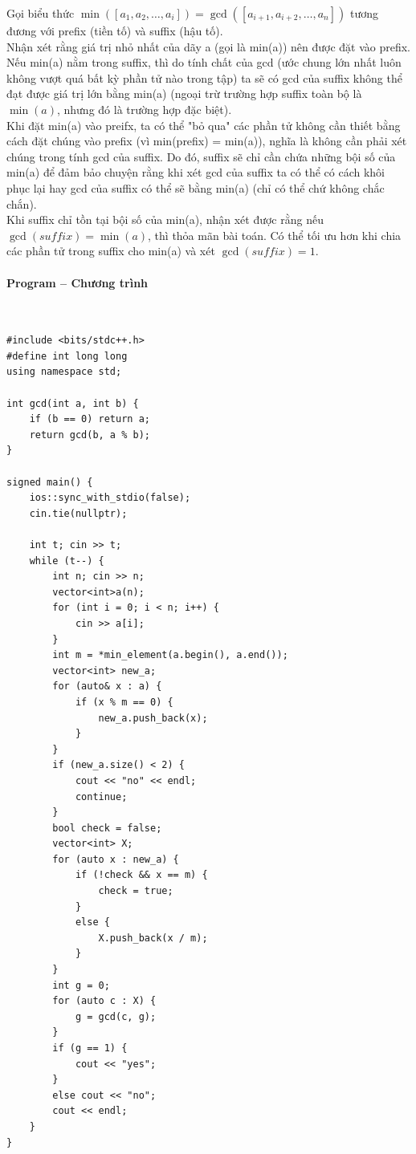 \documentclass{article}
\begin{document}
Gọi biểu thức $\min([a_1, a_2, \ldots, a_i]) = \gcd([a_{i+1}, a_{i+2}, \ldots, a_n])$ tương đương với prefix (tiền tố) và suffix (hậu tố).\\

Nhận xét rằng giá trị nhỏ nhất của dãy a (gọi là min(a)) nên được đặt vào prefix. Nếu min(a) nằm trong suffix, thì do tính chất của gcd (ước chung lớn nhất luôn không vượt quá bất kỳ phần tử nào trong tập) ta sẽ có gcd của suffix không thể đạt được giá trị lớn bằng min(a) (ngoại trừ trường hợp suffix toàn bộ là $\min(a)$, nhưng đó là trường hợp đặc biệt).\\

Khi đặt min(a) vào preifx, ta có thể "bỏ qua" các phần tử không cần thiết bằng cách đặt chúng vào prefix (vì min(prefix) = min(a)), nghĩa là không cần phải xét chúng trong tính gcd của suffix. Do đó, suffix sẽ chỉ cần chứa những bội số của min(a) để đảm bảo chuyện rằng khi xét gcd của suffix ta có thể có cách khôi phục lại hay gcd của suffix có thể sẽ bằng min(a) (chỉ có thể chứ không chắc chắn).\\

Khi suffix chỉ tồn tại bội số của min(a), nhận xét được rằng nếu $\gcd(suffix) = \min(a)$, thì thỏa mãn bài toán. Có thể tối ưu hơn khi chia các phần tử trong suffix cho min(a) và xét $\gcd(suffix) = 1$.

\paragraph{Program -- Chương trình} \mbox{} \\

\begin{lstlisting}
#include <bits/stdc++.h>
#define int long long
using namespace std;

int gcd(int a, int b) {
	if (b == 0) return a;
	return gcd(b, a % b);
}

signed main() {
	ios::sync_with_stdio(false);
	cin.tie(nullptr);

	int t; cin >> t;
	while (t--) {
		int n; cin >> n;
		vector<int>a(n);
		for (int i = 0; i < n; i++) {
			cin >> a[i];
		}
		int m = *min_element(a.begin(), a.end());
		vector<int> new_a;
		for (auto& x : a) {
			if (x % m == 0) {
				new_a.push_back(x);
			}
		}
		if (new_a.size() < 2) {
			cout << "no" << endl;
			continue;
		}
		bool check = false;
		vector<int> X;
		for (auto x : new_a) {
			if (!check && x == m) {
				check = true;
			}
			else {
				X.push_back(x / m);
			}
		}
		int g = 0;
		for (auto c : X) {
			g = gcd(c, g);
		}
		if (g == 1) {
			cout << "yes";
		}
		else cout << "no";
		cout << endl;
	}
}

\end{lstlisting}
\end{document}
